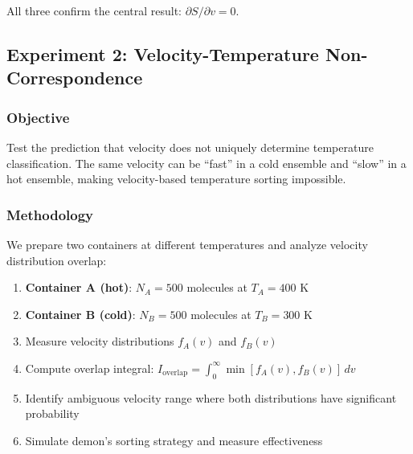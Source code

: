 \documentclass[10pt,twocolumn,letterpaper]{article}
\theoremstyle{definition}
\theoremstyle{remark}
\begin{document}
All three confirm the central result: $\partial S/\partial v = 0$.

\subsection{Experiment 2: Velocity-Temperature Non-Correspondence}

\subsubsection{Objective}

Test the prediction that velocity does not uniquely determine temperature classification. The same velocity can be ``fast'' in a cold ensemble and ``slow'' in a hot ensemble, making velocity-based temperature sorting impossible.

\subsubsection{Methodology}

We prepare two containers at different temperatures and analyze velocity distribution overlap:

\begin{enumerate}
\item \textbf{Container A (hot)}: $N_A = 500$ molecules at $T_A = 400$ K
\item \textbf{Container B (cold)}: $N_B = 500$ molecules at $T_B = 300$ K
\item Measure velocity distributions $f_A(v)$ and $f_B(v)$
\item Compute overlap integral: $I_{\text{overlap}} = \int_0^\infty \min[f_A(v), f_B(v)] \, dv$
\item Identify ambiguous velocity range where both distributions have significant probability
\item Simulate demon's sorting strategy and measure effectiveness
\end{enumerate}
\end{document}

